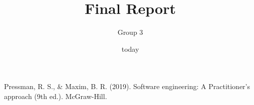 \documentclass[12pt, letterpaper]{article}
\title{Final Report}
\author{Group 3}
\date{today}
\begin{document}
\maketitle


\begin{thebibliography}
Pressman, R. S., & Maxim, B. R. (2019). Software engineering: A Practitioner's approach (9th ed.). McGraw-Hill.
\end{thebibliography}
\end{document}
